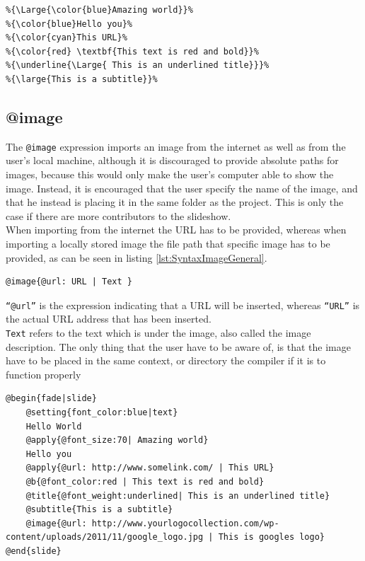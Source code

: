 {\begin{lstlisting}[frame=single, caption=Hello World with subtitle, label=lst:SyntaxSubtitle]
%Output: {\color{blue}Hello World}%
%{\Large{\color{blue}Amazing world}}%
%{\color{blue}Hello you}%
%{\color{cyan}This URL}%
%{\color{red} \textbf{This text is red and bold}}%
%{\underline{\Large{ This is an underlined title}}}%
%{\large{This is a subtitle}}%
\end{lstlisting}


\subsection{@image}
The \texttt{@image} expression imports an image from the internet as well as from the user's local machine, although it is discouraged to provide absolute paths for images, because this would only make the user's computer able to show the image. Instead, it is encouraged that the user specify the name of the image, and that he instead is placing it in the same folder as the project. This is only the case if there are more contributors to the slideshow.\\
When importing from the internet the URL has to be provided, whereas when importing a locally stored image the file path that specific image has to be provided, as can be seen in listing \ref{lst:SyntaxImageGeneral}.

\begin{lstlisting}[frame=single, caption=Image expression, label=lst:SyntaxImageGeneral]
@image{@url: URL | Text }
\end{lstlisting}

\texttt{``@url''} is the expression indicating that a URL will be inserted, whereas \texttt{``URL''} is the actual URL address that has been inserted. \\
\texttt{Text} refers to the text which is under the image, also called the image description.
The only thing that the user have to be aware of, is that the image have to be placed in the same context, or directory the compiler if it is to function properly


\begin{lstlisting}[frame=single, caption=Hello World with an image, label=lst:SyntaxImage]
@begin{fade|slide}
    @setting{font_color:blue|text}
    Hello World
    @apply{@font_size:70| Amazing world}
    Hello you
    @apply{@url: http://www.somelink.com/ | This URL}
    @b{@font_color:red | This text is red and bold}
    @title{@font_weight:underlined| This is an underlined title}
    @subtitle{This is a subtitle}
    @image{@url: http://www.yourlogocollection.com/wp-content/uploads/2011/11/google_logo.jpg | This is googles logo}
@end{slide}


\end{lstlisting}}
